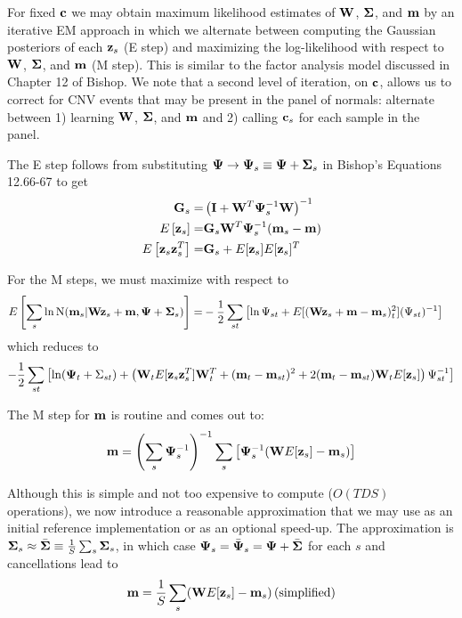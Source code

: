 \documentclass[nofootinbib,amssymb,amsmath]{revtex4}
\newcommand{\vI}{{\bf I}}
\newcommand{\vc}{{\bf c}}
\newcommand{\vz}{{\bf z}}
\newcommand{\vm}{{\bf m}}
\newcommand{\vG}{{\bf G}}
\newcommand{\vW}{{\bf W}}
\newcommand{\vPsi}{{\bf \Psi}}
\newcommand{\vSigma}{{\bf \Sigma}}
\begin{document}
For fixed $\vc$ we may obtain maximum likelihood estimates of $\vW$, $\vSigma$, and $\vm$ by an iterative EM approach in which we alternate between computing the Gaussian posteriors of each $\vz_s$ (E step) and maximizing the log-likelihood with respect to $\vW$, $\vSigma$, and $\vm$ (M step).  This is similar to the factor analysis model discussed in Chapter 12 of Bishop.  We note that a second level of iteration, on $\vc$, allows us to correct for CNV events that may be present in the panel of normals: alternate between 1) learning $\vW$, $\vSigma$, and $\vm$ and 2) calling $\vc_s$ for each sample in the panel.

The E step follows from substituting $\vPsi \rightarrow \vPsi_s \equiv  \vPsi + \vSigma_s$ in Bishop's Equations 12.66-67 to get
%
\begin{align}
\vG_s =& \left( \vI + \vW^T \vPsi_s^{-1} \vW \right)^{-1} \\
E \left[ \vz_s \right] =& \vG_s \vW^T \vPsi_s^{-1} (\vm_s - \vm) \\
E \left[ \vz_s \vz_s^T \right] =& \vG_s + E[\vz_s] E[\vz_s]^T
\end{align}
%

For the M steps, we must maximize with respect to 
%
\begin{align}
E \left[ \sum_s \ln {\rm N}(\vm_s | \vW \vz_s + \vm, \vPsi + \vSigma_s) \right] =& -\frac{1}{2} \sum_{st} \left[ \ln \Psi_{st}+ E[(\vW \vz_s + \vm - \vm_s)_t^2] (\Psi_{st})^{-1} \right] 
\end{align}
which reduces to
\begin{equation}
 -\frac{1}{2} \sum_{st} \left[ \ln (\vPsi_t + \Sigma_{st}) + \left( \vW_t  E[\vz_s \vz_s^T] \vW_t^T + (\vm_t - \vm_{st})^2 +2 (\vm_t - \vm_{st}) \vW_t E[\vz_s] \right)\Psi_{st}^{-1} \right]
\end{equation}
%


The M step for $\vm$ is routine and comes out to:
\begin{align}
\vm = \left( \sum_s \vPsi_{s}^{-1} \right)^{-1} \sum_s \left[ \vPsi_{s}^{-1}  (\vW  E[\vz_{s}] - \vm_{s} ) \right] 
\end{align}

Although this is simple and not too expensive to compute ($O(TDS)$ operations), we now introduce a reasonable approximation that we may use as an initial reference implementation or as an optional speed-up.  The approximation is $\vSigma_s \approx \bar{\vSigma} \equiv \frac{1}{S} \sum_s \vSigma_s$, in which case $\vPsi_s = \bar{\vPsi}_s = \vPsi + \bar{\vSigma}$ for each $s$ and cancellations lead to
\begin{align}
\vm = \frac{1}{S} \sum_s  (\vW  E[\vz_{s}] - \vm_{s} )  \, {\rm (simplified)}
\end{align}
\end{document}
